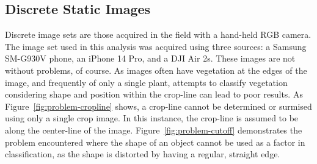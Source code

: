 \documentclass[letterpaper]{article}
\begin{document}
\subsection{Discrete Static Images}
Discrete image sets are those acquired in the field with a hand-held RGB camera. The image set used in this analysis was acquired using three sources: a Samsung SM-G930V phone, an iPhone 14 Pro, and a DJI Air 2s. These images are not without problems, of course. As images often have vegetation at the edges of the image, and frequently of only a single plant, attempts to classify vegetation considering shape and position within the crop-line can lead to poor results. As Figure~\ref{fig:problem-cropline} shows, a crop-line cannot be determined or surmised using only a single crop image. In this instance, the crop-line is assumed to be along the center-line of the image. Figure~\ref{fig:problem-cutoff} demonstrates the problem encountered where the shape of an object cannot be used as a factor in classification, as the shape is distorted by having a regular, straight edge.
\end{document}
